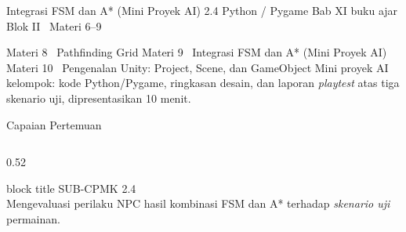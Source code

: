 \documentclass[aspectratio=169,10pt]{beamer}
\begin{document}
  {Integrasi FSM dan A* (Mini Proyek AI)}
  {2.4}
  {Python / Pygame}
  {Bab XI buku ajar}
  {Blok II \textperiodcentered\ Materi 6--9}

  {Materi 8 \textperiodcentered\ Pathfinding Grid}
  {Materi 9 \textperiodcentered\ Integrasi FSM dan A* (Mini Proyek AI)}
  {Materi 10 \textperiodcentered\ Pengenalan Unity: Project, Scene, dan
   GameObject}
  {Mini proyek AI kelompok: kode Python/Pygame, ringkasan desain, dan laporan
   \emph{playtest} atas tiga skenario uji, dipresentasikan 10 menit.}

\begin{frame}{Capaian Pertemuan}
\begin{columns}[T,onlytextwidth]
  \begin{column}{0.52\textwidth}
    \begin{beamercolorbox}[wd=\linewidth,sep=5pt,rounded=true]{block title}
      {\fontsize{6.8}{8}\selectfont\color{ubHead}SUB-CPMK 2.4}\\[2pt]
      {\footnotesize Mengevaluasi perilaku NPC hasil kombinasi FSM dan A*
       terhadap \emph{skenario uji} permainan.}
    \end{beamercolorbox}
    \vspace{0.14cm}


\end{column}
\end{columns}
\end{frame}
\end{document}
